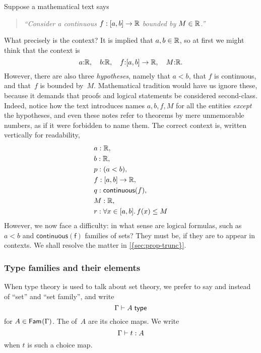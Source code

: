 \begin{example}
  \label{example:context}
  Suppose a mathematical text says
  \begin{quote}
    \emph{``Consider a continuous $f : [a, b] \to \mathbb{R}$ bounded by $M \in \mathbb{R}$.''}
  \end{quote}
  What precisely is the context? It is implied that $a, b \in \mathbb{R}$, so at first we might think that the context is
  \begin{equation*}
    a {:} \mathbb{R}, \quad
    b {:} \mathbb{R}, \quad
    f {:} [a, b] \to \mathbb{R}, \quad
    M {:} \mathbb{R}.
  \end{equation*}
  However, there are also three \emph{hypotheses}, namely that $a < b$, that $f$ is continuous, and that~$f$ is bounded by~$M$.
  Mathematical tradition would have us ignore these, because it demands that proofs and logical statements be considered second-class. Indeed, notice how the text introduces names $a, b, f, M$ for all the entities \emph{except} the hypotheses, and even these notes refer to theorems by mere unmemorable numbers, as if it were forbidden to name them.
  The correct context is, written vertically for readability,
  \begin{align*}
    & a : \mathbb{R}, \\
    & b : \mathbb{R}, \\
    & p : (a < b), \\
    & f : [a, b] \to \mathbb{R}, \\
    & q : \mathsf{continuous}(f), \\
    & M : \mathbb{R}, \\
    & r : \forall x \in [a,b] .\, f(x) \leq M
  \end{align*}
  However, we now face a difficulty: in what sense are logical formulas, such as $a < b$ and $\mathsf{continuous(f)}$ families of sets? They must be, if they are to appear in contexts. We shall resolve the matter in \cref{{sec:prop-trunc}}.
\end{example}

\subsubsection{Type families and their elements}
\label{sec:type-families}

When type theory is used to talk about set theory, we prefer to say  and  instead of ``set'' and ``set family'', and write
%
\begin{equation*}
  \Gamma \vdash A \;\mathsf{type}
\end{equation*}
%
for $A \in \mathsf{Fam}_{}(\Gamma)$.
%
The  of~$A$ are its choice maps. We write
%
\begin{equation*}
  \Gamma \vdash t : A
\end{equation*}
%
when $t$ is such a choice map.

